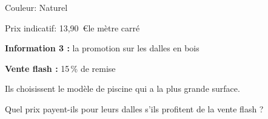 Couleur: Naturel

Prix indicatif: 13,90~\euro le mètre carré

\medskip

\textbf{Information 3 :} la promotion sur les dalles en bois

\begin{center}
\textbf{Vente flash :} 15\,\% de remise
\end{center}

Ils choisissent le modèle de piscine qui a la plus grande surface.

Quel prix payent-ils pour leurs dalles s'ils profitent de la vente flash ?
\vspace{0.25cm}

